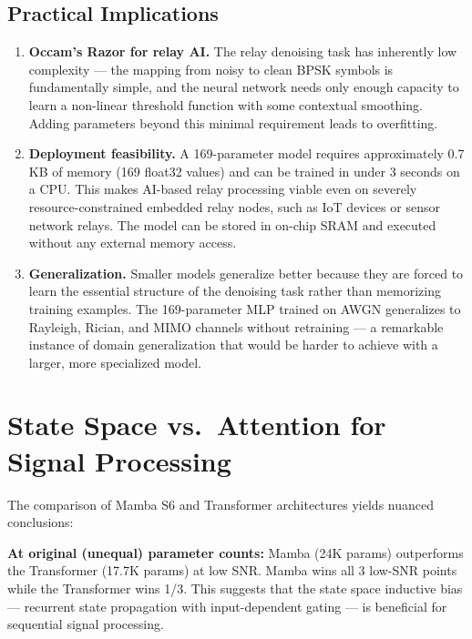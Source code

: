 \documentclass[
  english,
  12pt,
  12pt,
  a4paper,
  oneside]{report}
\begin{document}
\subsection{Practical Implications}\label{sec:practical-implications}

\begin{enumerate}
\def\labelenumi{\arabic{enumi}.}
\item
  \textbf{Occam's Razor for relay AI.} The relay denoising task has inherently low complexity --- the mapping from noisy to clean BPSK symbols is fundamentally simple, and the neural network needs only enough capacity to learn a non-linear threshold function with some contextual smoothing. Adding parameters beyond this minimal requirement leads to overfitting.
\item
  \textbf{Deployment feasibility.} A 169-parameter model requires approximately 0.7 KB of memory (169 float32 values) and can be trained in under 3 seconds on a CPU. This makes AI-based relay processing viable even on severely resource-constrained embedded relay nodes, such as IoT devices or sensor network relays. The model can be stored in on-chip SRAM and executed without any external memory access.
\item
  \textbf{Generalization.} Smaller models generalize better because they are forced to learn the essential structure of the denoising task rather than memorizing training examples. The 169-parameter MLP trained on AWGN generalizes to Rayleigh, Rician, and MIMO channels without retraining --- a remarkable instance of domain generalization that would be harder to achieve with a larger, more specialized model.
\end{enumerate}

\section{State Space vs.~Attention for Signal Processing}\label{sec:state-space-vs.-attention-for-signal-processing}

The comparison of Mamba S6 and Transformer architectures yields nuanced conclusions:

\textbf{At original (unequal) parameter counts:} Mamba (24K params) outperforms the Transformer (17.7K params) at low SNR. Mamba wins all 3 low-SNR points while the Transformer wins 1/3. This suggests that the state space inductive bias --- recurrent state propagation with input-dependent gating --- is beneficial for sequential signal processing.
\end{document}
